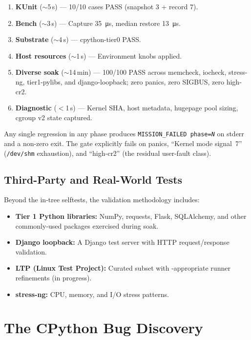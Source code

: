 \begin{enumerate}[leftmargin=2em]
  \item \textbf{KUnit} ($\sim$5\,s) --- 10/10 cases PASS (snapshot 3 +
    record 7).
  \item \textbf{Bench} ($\sim$3\,s) --- Capture \SI{35}{\micro\second},
    median restore \SI{13}{\micro\second}.
  \item \textbf{Substrate} ($\sim$4\,s) --- cpython-tier0 PASS.
  \item \textbf{Host resources} ($\sim$1\,s) --- Environment knobs applied.
  \item \textbf{Diverse soak} ($\sim$14\,min) --- 100/100 PASS across
    memcheck, iocheck, stress-ng, tier1-pylibs, and
    django-loopback; zero panics, zero SIGBUS, zero high-cr2.
  \item \textbf{Diagnostic} ($<$1\,s) --- Kernel SHA, host metadata,
    hugepage pool sizing, cgroup v2 state captured.
\end{enumerate}

\noindent
Any single regression in any phase produces
\texttt{MISSION\_FAILED phase=\textit{N}} on stderr and a non-zero
exit.  The gate explicitly fails on panics, ``Kernel mode signal~7''
(\texttt{/dev/shm} exhaustion), and ``high-cr2'' (the residual
user-fault class).

\subsection{Third-Party and Real-World Tests}

Beyond the in-tree selftests, the validation methodology includes:

\begin{itemize}[leftmargin=2em]
  \item \textbf{Tier 1 Python libraries:} NumPy, requests, Flask,
    SQLAlchemy, and other commonly-used packages exercised during soak.
  \item \textbf{Django loopback:} A Django test server with HTTP
    request/response validation.
  \item \textbf{LTP (Linux Test Project):} Curated subset with
    \UML{}-appropriate runner refinements (in progress).
  \item \textbf{stress-ng:} CPU, memory, and I/O stress patterns.
\end{itemize}


\section{The CPython Bug Discovery}
\label{sec:v2-cpython-bug}

